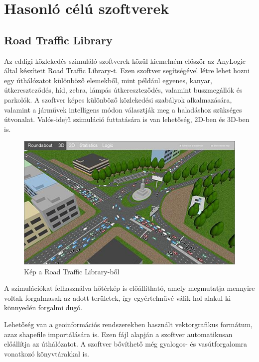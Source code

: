 ﻿

\section{Hasonló célú szoftverek}
\subsection{Road Traffic Library}


Az eddigi közlekedés-szimuláló szoftverek közül kiemelném először az AnyLogic által készített Road Traffic Library-t. Ezen szoftver segítségével létre lehet hozni egy úthálózatot
különböző elemekből, mint például egyenes, kanyar, útkereszteződés, híd, zebra, lámpás útkereszteződés, valamint buszmegállók és parkolók.
A szoftver képes különböző közlekedési szabályok alkalmazására, valamint a járművek intelligens módon választják meg a haladáshoz szükséges útvonalat.
Valós-idejű szimuláció futtatására is van lehetőség, 2D-ben és 3D-ben is. 

\begin{figure}[h]
\includegraphics[width=\linewidth]{RTL.png}
\caption{Kép a Road Traffic Library-ből}
\label{fig:RTL}
\end{figure}

A szimulációkat felhasználva hőtérkép is előállítható, amely megmutatja mennyire voltak
forgalmasak az adott területek, így egyértelművé válik hol alakul ki könnyedén forgalmi dugó.

Lehetőség van a geoinformációs rendszerekben használt vektorgrafikus formátum, azaz shapefile importálására is. Ezen fájl alapján a szoftver automatikusan
előállítja az úthálózatot. A szoftver bővíthető még gyalogos- és vasútforgalomra vonatkozó könyvtárakkal is.

